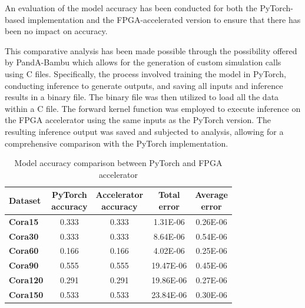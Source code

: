 An evaluation of the model accuracy has been conducted for both the PyTorch-based implementation and the FPGA-accelerated version to ensure that there has been no impact on accuracy.

This comparative analysis has been made possible through the possibility offered by PandA-Bambu which allows for the generation of custom simulation calls using C files.
Specifically, the process involved training the model in PyTorch, conducting inference to generate outputs, and saving all inputs and inference results in a binary file.
The binary file was then utilized to load all the data within a C file.
The forward kernel function was employed to execute inference on the FPGA accelerator using the same inputs as the PyTorch version.
The resulting inference output was saved and subjected to analysis, allowing for a comprehensive comparison with the PyTorch implementation.

\begin{table}[t]
\centering
    \begin{tabular}{|p{5em} c c c c|}
    \hline
    \textbf{Dataset} & \thead{PyTorch\\accuracy} & \thead{Accelerator\\accuracy} & \thead{Total\\error} & \thead{Average\\error} \T\B \\
    \hline \hline
    \textbf{Cora15} & 0.333 & 0.333 & 1.31E-06 & 0.26E-06 \T\B\\
    \hline
    \textbf{Cora30} & 0.333 & 0.333 & 8.64E-06 & 0.54E-06  \T\B\\
    \hline
    \textbf{Cora60} & 0.166 & 0.166 & 4.02E-06 & 0.25E-06 \T\B\\
    \hline
    \textbf{Cora90} & 0.555 & 0.555 & 19.47E-06 & 0.45E-06 \T\B\\
    \hline
    \textbf{Cora120} & 0.291 & 0.291 & 19.86E-06 & 0.27E-06 \T\B\\
    \hline
    \textbf{Cora150} & 0.533 & 0.533 & 23.84E-06 & 0.30E-06 \T\B\\
    \hline
    \end{tabular}
    \\[10pt]
    \caption{Model accuracy comparison between PyTorch and FPGA accelerator}
    \label{tab:model-accuracy-analysis}
\end{table}

